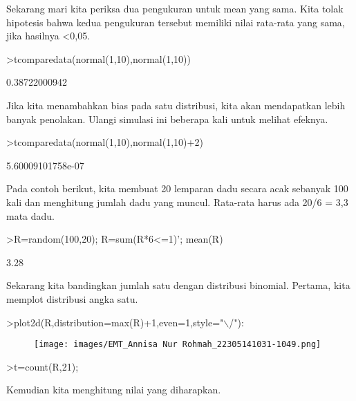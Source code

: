 \documentclass[a4paper,10pt]{article}
\begin{document}
\begin{eulernotebook}
\begin{eulercomment}
\begin{eulercomment}
\begin{eulercomment}
\begin{eulercomment}
\begin{eulercomment}
Sekarang mari kita periksa dua pengukuran untuk mean yang sama. Kita
tolak hipotesis bahwa kedua pengukuran tersebut memiliki nilai
rata-rata yang sama, jika hasilnya \textless{}0,05.
\end{eulercomment}
\begin{eulerprompt}
>tcomparedata(normal(1,10),normal(1,10))
\end{eulerprompt}
\begin{euleroutput}
  0.38722000942
\end{euleroutput}
\begin{eulercomment}
Jika kita menambahkan bias pada satu distribusi, kita akan mendapatkan
lebih banyak penolakan. Ulangi simulasi ini beberapa kali untuk
melihat efeknya.
\end{eulercomment}
\begin{eulerprompt}
>tcomparedata(normal(1,10),normal(1,10)+2)
\end{eulerprompt}
\begin{euleroutput}
  5.60009101758e-07
\end{euleroutput}
\begin{eulercomment}
Pada contoh berikut, kita membuat 20 lemparan dadu secara acak
sebanyak 100 kali dan menghitung jumlah dadu yang muncul. Rata-rata
harus ada 20/6 = 3,3 mata dadu.
\end{eulercomment}
\begin{eulerprompt}
>R=random(100,20); R=sum(R*6<=1)'; mean(R)
\end{eulerprompt}
\begin{euleroutput}
  3.28
\end{euleroutput}
\begin{eulercomment}
Sekarang kita bandingkan jumlah satu dengan distribusi binomial.
Pertama, kita memplot distribusi angka satu.
\end{eulercomment}
\begin{eulerprompt}
>plot2d(R,distribution=max(R)+1,even=1,style="\(\backslash\)/"):
\end{eulerprompt}
\begin{figure}[h]
    \centering
    \texttt{[image: images/EMT\_Annisa Nur Rohmah\_22305141031-1049.png]}
\end{figure}
\begin{eulerprompt}
>t=count(R,21);
\end{eulerprompt}
\begin{eulercomment}
Kemudian kita menghitung nilai yang diharapkan.
\end{eulercomment}
\begin{eulerprompt}

\end{eulerprompt}
\end{eulercomment}
\end{eulercomment}
\end{eulercomment}
\end{eulercomment}
\end{eulernotebook}
\end{document}
